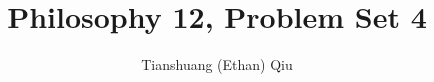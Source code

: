 \documentclass[12pt]{article}
\author{Tianshuang (Ethan) Qiu}
\begin{document}
\title{Philosophy 12, Problem Set 4}
\maketitle
\end{document}
